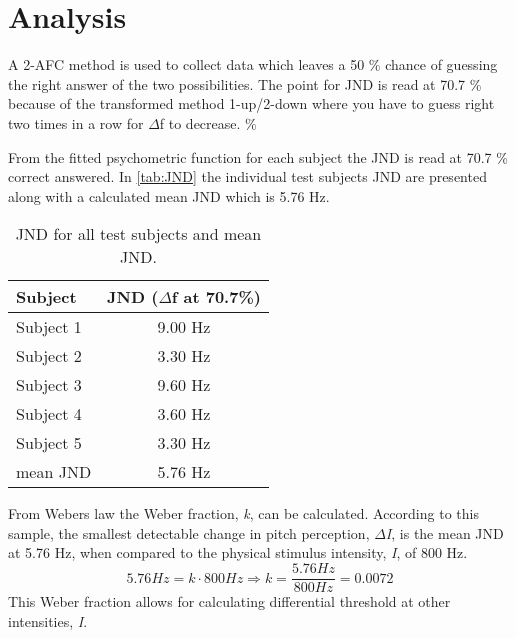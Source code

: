 \section*{Analysis}
A 2-AFC method is used to collect data which leaves a 50 \% chance of guessing the right answer of the two possibilities. The point for JND is read at 70.7 \% because of the transformed method 1-up/2-down where you have to guess right two times in a row for $\Delta$f to decrease.
\%

From the fitted psychometric function for each subject the JND is read at 70.7 \% correct answered. In \autoref{tab:JND} the individual test subjects JND are presented along with a calculated mean JND which is 5.76 Hz. 
%
\begin{table}[H]
	\centering
	\begin{tabular}{l|c}
		Subject     & JND ($\Delta$f at 70.7\%) \\\hline
		Subject 1   & 9.00 Hz          \\\hline
		Subject 2   & 3.30 Hz            \\\hline
		Subject 3   & 9.60 Hz              \\\hline
		Subject 4   & 3.60 Hz            \\\hline
		Subject 5   & 3.30 Hz               \\\hline
		mean JND &    5.76 Hz   
	\end{tabular}
	\caption{JND for all test subjects and mean JND.}
	\label{tab:JND}         
\end{table}
\noindent
%
From Webers law the Weber fraction, \textit{k}, can be calculated. According to this sample, the smallest detectable change in pitch perception, \textit{$\Delta$I}, is the mean JND at 5.76 Hz, when compared to the physical stimulus intensity, \textit{I}, of 800 Hz.
% 
\begin{equation}
5.76 Hz = k \cdot 800 Hz \Rightarrow k = \frac{5.76 Hz}{800 Hz} = 0.0072
\end{equation}
%
This Weber fraction allows for calculating differential threshold at other intensities, \textit{I}. 
%
